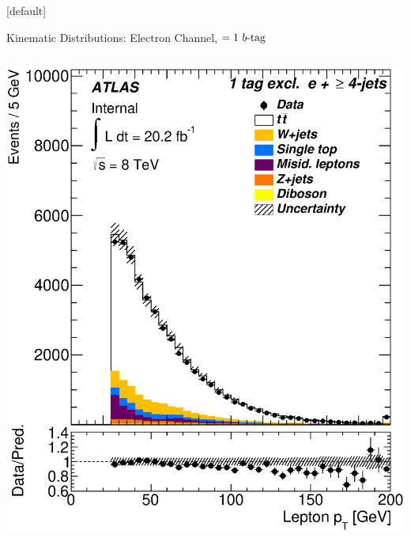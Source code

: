 \documentclass{beamer}
\begin{document}
{  \makeatletter %
  [default]
  \def\beamer@entrycode{\vspace*{-1.075\headheight}}
  \begin{frame}{Kinematic Distributions: Electron Channel, $=1\text{ } \lowercase{ b\text{-tag}}$}
    \vspace{5pt}
    \begin{columns}
      \includegraphics[width=.95\textwidth]{../chapters/whel/figures/control_Plots2/bTag_1excl/LeptonPt_el}\\

\end{columns}
\end{frame}}
\end{document}
